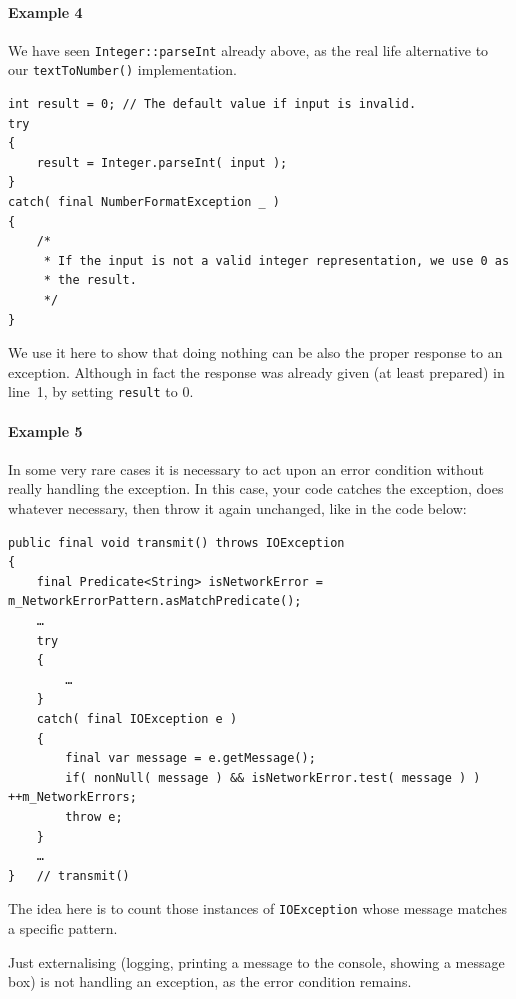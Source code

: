 \paragraph{Example 4} We have seen \lstinline|Integer::parseInt| \autocite{ORACLE_DOC_INTEGER:parseInt} already above, as the real life alternative to our \lstinline|textToNumber()| implementation.

\begin{lstlisting}
int result = 0; // The default value if input is invalid.
try
{
    result = Integer.parseInt( input );
}
catch( final NumberFormatException _ )
{
    /*
     * If the input is not a valid integer representation, we use 0 as
     * the result. 
     */
}
\end{lstlisting}

We use it here to show that doing nothing can be also the proper response to an exception. Although in fact the response was already given (at least prepared) in line~1, by setting \lstinline|result| to 0.

\paragraph{Example 5} In some very rare cases it is necessary to act upon an error condition without really handling the exception. In this case, your code catches the exception, does whatever necessary, then throw it again unchanged, like in the code below:
\begin{lstlisting}
public final void transmit() throws IOException
{
    final Predicate<String> isNetworkError = m_NetworkErrorPattern.asMatchPredicate();
    …
    try
    {
        …
    }
    catch( final IOException e )
    {
        final var message = e.getMessage();
        if( nonNull( message ) && isNetworkError.test( message ) ) ++m_NetworkErrors;
        throw e;
    }
    …
}   // transmit()
\end{lstlisting}

The idea here is to count those instances of \lstinline|IOException| whose message matches a specific pattern.

\bigskip

Just externalising (logging, printing a message to the console, showing a message box) is not handling an exception, as the error condition remains.

